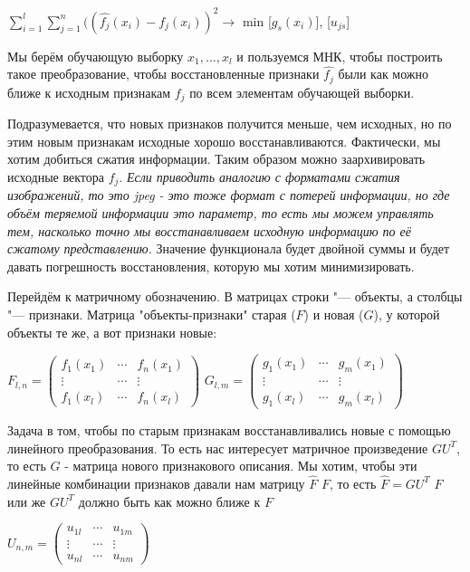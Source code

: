 $\displaystyle\sum_{i=1}^{l}\displaystyle\sum_{j=1}^{n} ((\hat{f_j}(x_i)-f_j(x_i))^2 \rightarrow$ min [$g_s(x_i)$], [$u_{js}$] \par

Мы берём обучающую выборку $x_1, \dotsc, x_l$ и пользуемся МНК, чтобы построить такое преобразование, чтобы восстановленные признаки $\hat{f_j}$ были как можно ближе к исходным признакам $f_j$ по всем элементам обучающей выборки.\par Подразумевается, что новых признаков получится меньше, чем исходных, но по этим новым признакам исходные хорошо восстанавливаются. Фактически, мы хотим добиться сжатия информации. Таким образом можно заархивировать исходные вектора $f_j$. \textit{Если приводить аналогию с форматами сжатия изображений, то это jpeg - это тоже формат с потерей информации, но где объём теряемой информации это параметр, то есть мы можем управлять тем, насколько точно мы восстанавливаем исходную информацию по её сжатому представлению.} Значение функционала будет двойной суммы и будет давать погрешность восстановления, которую мы хотим минимизировать.

Перейдём к матричному обозначению. В матрицах строки "--- объекты, а столбцы "--- признаки. Матрица "объекты-признаки" старая ($F$) и новая ($G$), у которой объекты те же, а вот признаки новые: \par
$F_{l,n} =
 \begin{pmatrix}
  f_1(x_1) &  \cdots & f_n(x_1) \\
  \vdots   &  \cdots & \vdots   \\
  f_1(x_l) &  \cdots & f_n(x_l)
 \end{pmatrix}$
$G_{l,m} =
 \begin{pmatrix}
  g_1(x_1) &  \cdots & g_m(x_1) \\
  \vdots   &  \cdots & \vdots   \\
  g_1(x_l) &  \cdots & g_m(x_l)
 \end{pmatrix}$

Задача в том, чтобы по старым признакам восстанавливались новые с помощью линейного преобразования. То есть нас интересует матричное произведение $GU^T$, то есть $G$ - матрица нового признакового описания. Мы хотим, чтобы эти линейные комбинации признаков давали нам матрицу $\hat{F}$ \approx $F$, то есть $\hat{F} = GU^T$  \approx $F$ или же $GU^T$ должно быть как можно ближе к $F$ \par
 $U_{n,m} =
 \begin{pmatrix}
  u_{1l} &  \cdots & u_{1m} \\
  \vdots &  \cdots & \vdots \\
  u_{nl} &  \cdots & u_{nm}
 \end{pmatrix}$\par

